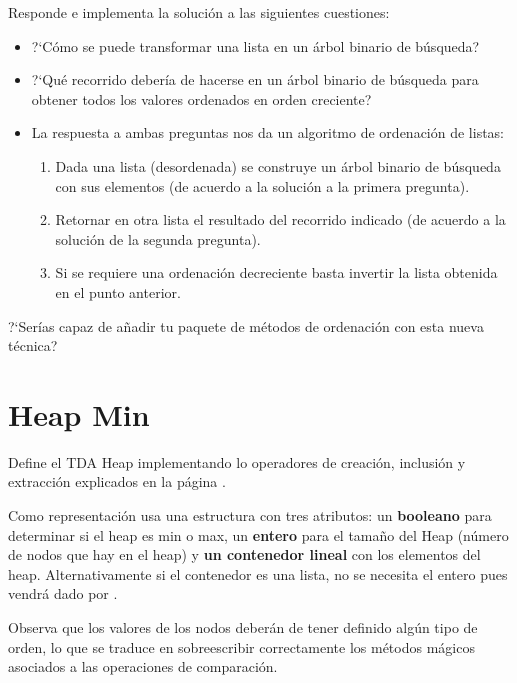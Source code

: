 Responde e implementa la solución a las siguientes cuestiones:
\begin{itemize}
\item ?`Cómo se puede transformar una lista en un árbol binario de búsqueda?
\item ?`Qué recorrido debería de hacerse en un árbol binario de búsqueda para obtener todos los valores ordenados en orden creciente?
\item La respuesta a ambas preguntas nos da un algoritmo de ordenación de listas:
	\begin{enumerate}
	\item Dada una lista (desordenada) se construye  un árbol binario de búsqueda con sus elementos (de acuerdo a la solución a la primera pregunta).
	\item Retornar en otra lista el resultado del recorrido indicado (de acuerdo a la solución de la segunda pregunta).
	\item Si se requiere una ordenación decreciente basta invertir la lista obtenida en el punto anterior.
	\end{enumerate} 
\end{itemize}

?`Serías capaz de añadir tu paquete de métodos de ordenación con esta nueva técnica?

%




\separacion
\section{Heap Min} \label{sec:heapmin}

Define el TDA Heap  implementando lo operadores de creación, inclusión y extracción explicados en la página \pageref{sec:HeapSort}.

Como representación usa una estructura con tres atributos: un \textbf{booleano} para determinar si el heap es min o max, un \textbf{entero} para el tamaño del Heap (número de nodos que hay en el heap) y \textbf{un contenedor lineal} con los elementos del heap. Alternativamente si el contenedor es una lista, no se necesita el entero pues vendrá dado por .

Observa que los valores de los nodos deberán de tener definido algún tipo de orden, lo que se traduce en sobreescribir correctamente los métodos mágicos asociados a las operaciones de comparación.

